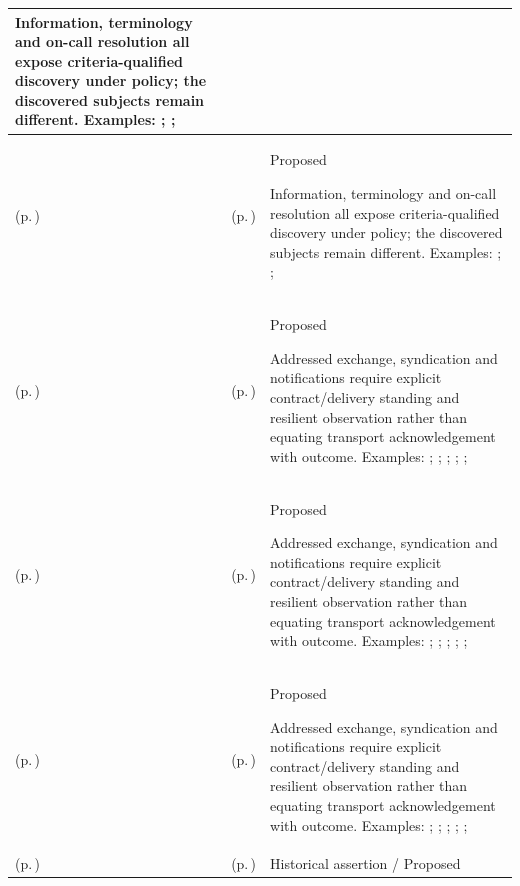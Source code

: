 \begin{longtable}{|>{\raggedright\arraybackslash}p{0.27\TableWidth}|>{\raggedright\arraybackslash}p{0.27\TableWidth}|>{\raggedright\arraybackslash}p{0.46\TableWidth}|}
Information, terminology and on-call resolution all expose criteria-qualified discovery under policy; the discovered subjects remain different. Examples: \nameref{feature:feat-hso-18}; \nameref{function:resolve-active-on-call-coverage}; \nameref{service:on-call-specialist-lookup}\\\hline
\nameref{cap:bec-on-call-management} (p.\,\pageref{cap:bec-on-call-management}) & \nameref{cap:ec-06} (p.\,\pageref{cap:ec-06}) & Proposed

Information, terminology and on-call resolution all expose criteria-qualified discovery under policy; the discovered subjects remain different. Examples: \nameref{feature:feat-hso-18}; \nameref{function:resolve-active-on-call-coverage}; \nameref{service:on-call-specialist-lookup}\\\hline
\nameref{cap:bec-health-information-exchange} (p.\,\pageref{cap:bec-health-information-exchange}) & \nameref{cap:ec-08} (p.\,\pageref{cap:ec-08}) & Proposed

Addressed exchange, syndication and notifications require explicit contract/delivery standing and resilient observation rather than equating transport acknowledgement with outcome. Examples: \nameref{feature:feat-ise-04}; \nameref{feature:feat-ise-05}; \nameref{feature:feat-ise-06}; \nameref{feature:feat-ise-07}; \nameref{function:receive-information-submission}; \nameref{service:hie-submission-gateway-service}\\\hline
\nameref{cap:bec-health-information-exchange} (p.\,\pageref{cap:bec-health-information-exchange}) & \nameref{cap:ec-09} (p.\,\pageref{cap:ec-09}) & Proposed

Addressed exchange, syndication and notifications require explicit contract/delivery standing and resilient observation rather than equating transport acknowledgement with outcome. Examples: \nameref{feature:feat-ise-04}; \nameref{feature:feat-ise-05}; \nameref{feature:feat-ise-06}; \nameref{feature:feat-ise-07}; \nameref{function:receive-information-submission}; \nameref{service:hie-submission-gateway-service}\\\hline
\nameref{cap:bec-health-information-exchange} (p.\,\pageref{cap:bec-health-information-exchange}) & \nameref{cap:ec-12} (p.\,\pageref{cap:ec-12}) & Proposed

Addressed exchange, syndication and notifications require explicit contract/delivery standing and resilient observation rather than equating transport acknowledgement with outcome. Examples: \nameref{feature:feat-ise-04}; \nameref{feature:feat-ise-05}; \nameref{feature:feat-ise-06}; \nameref{feature:feat-ise-07}; \nameref{function:receive-information-submission}; \nameref{service:hie-submission-gateway-service}\\\hline
\nameref{cap:bec-health-information-communication} (p.\,\pageref{cap:bec-health-information-communication}) & \nameref{cap:ec-08} (p.\,\pageref{cap:ec-08}) & Historical assertion / Proposed


\end{longtable}
